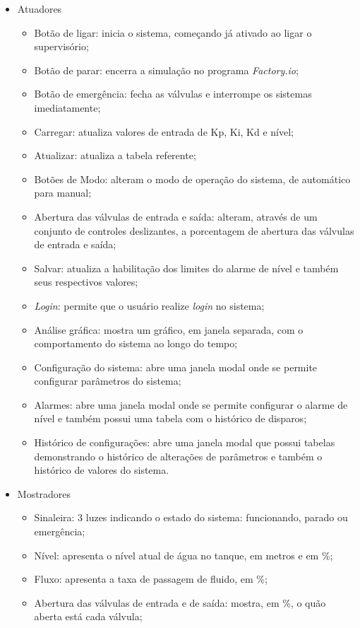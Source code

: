 \documentclass[
	article,			%
	11pt,				%
	oneside,			%
	a4paper,			%
	section=TITLE,		%
	english,			%
	brazil,				%
	sumario=tradicional
	]{abntex2}
\newcommand{\factorio}{\textit{Factory.io}}%
\begin{document}
\begin{itemize}
\item Atuadores
\begin{itemize}
    \item Botão de ligar: inicia o sistema, começando já ativado ao ligar o supervisório;
    \item Botão de parar: encerra a simulação no programa \factorio;
    \item Botão de emergência: fecha as válvulas e interrompe os sistemas imediatamente; 
    \item Carregar: atualiza valores de entrada de Kp, Ki, Kd e nível;
    \item Atualizar: atualiza a tabela referente; 
    \item Botões de Modo: alteram o modo de operação do sistema, de automático para manual;
    \item Abertura das válvulas de entrada e saída: alteram, através de um conjunto de controles deslizantes, a porcentagem de abertura das válvulas de entrada e saída;
    \item Salvar: atualiza a habilitação dos limites do alarme de nível e também seus respectivos valores;
    \item \textit{Login}: permite que o usuário realize \textit{login} no sistema;
    \item Análise gráfica: mostra um gráfico, em janela separada, com o comportamento do sistema ao longo do tempo;
    \item Configuração do sistema: abre uma janela modal onde se permite configurar parâmetros do sistema;
    \item Alarmes: abre uma janela modal onde se permite configurar o alarme de nível e também possui uma tabela com o histórico de disparos;
    \item Histórico de configurações: abre uma janela modal que possui tabelas demonstrando o histórico de alterações de parâmetros e também o histórico de valores do sistema.
\end{itemize}
\item Mostradores
\begin{itemize}
    \item Sinaleira: 3 luzes indicando o estado do sistema: funcionando, parado ou emergência;
    \item Nível: apresenta o nível atual de água no tanque, em metros e em \%;
    \item Fluxo: apresenta a taxa de passagem de fluido, em \%;
    \item Abertura das válvulas de entrada e de saída: mostra, em \%, o quão aberta está cada válvula;

\end{itemize}
\end{itemize}
\end{document}
